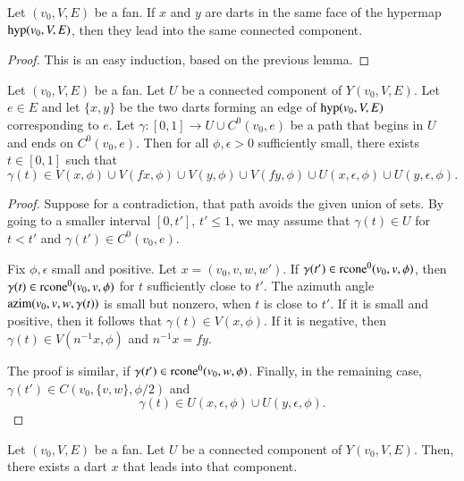 \begin{lemma} Let $(v_0,V,E)$ be a fan.
If $x$ and $y$ are darts in the same face of the hypermap
${\operatorname{hyp}}(v_0,V,E)$, then they lead into the same connected component.
\end{lemma}

\begin{proof}  This is an easy induction, based on the previous
lemma.  
\end{proof}



\begin{lemma}\label{lemma:approach-Ce}
Let $(v_0,V,E)$ be a fan.  Let $U$ be a connected
component of $Y(v_0,V,E)$.  Let $e\in E$ and let $\{x,y\}$
be the two darts forming an edge of ${\operatorname{hyp}}(v_0,V,E)$
corresponding to $e$.  Let $\gamma:[0,1]\to U\cup C^0(v_0,e)$
be a path that begins in $U$ and ends on $C^0(v_0,e)$.
Then for all $\phi,\epsilon>0$ sufficiently small,
there exists  $t\in[0,1]$ such that
  $$\gamma(t)\in 
  V(x,\phi) \cup 
  V(f x,\phi)\cup 
  V(y,\phi)\cup 
  V(f y,\phi) 
  \cup U(x,\epsilon,\phi)
  \cup U(y,\epsilon,\phi).
  $$
\end{lemma}

\begin{proof}
Suppose for a contradiction, that path avoids the given union
of sets.  By going to a smaller interval $[0,t']$, $t'\le 1$,
we may assume that $\gamma(t)\in U$ for $t < t'$ and $\gamma(t')\in
C^0(v_0,e)$.  

Fix $\phi,\epsilon$ small and positive.
Let $x = (v_0,v,w,w')$.
If $\gamma(t')\in {\operatorname{rcone}}^0(v_0,v,\phi)$, then $\gamma(t)\in
{\operatorname{rcone}}^0(v_0,v,\phi)$ for $t$ sufficiently close to $t'$.  The
azimuth angle ${\operatorname{azim}}(v_0,v,w,\gamma(t))$ is small but nonzero, 
when
$t$ is close to $t'$.  If it is small and positive, then 
it follows that $\gamma(t)\in V(x,\phi)$.  If it is negative, then
$\gamma(t)\in V(n^{-1} x,\phi)$ and $n^{-1} x = f y$.

The proof is similar, if $\gamma(t')\in {\operatorname{rcone}}^0(v_0,w,\phi)$.
Finally, in the remaining case, 
$\gamma(t')\in C(v_0,\{v,w\},\phi/2)$ and 
$$\gamma(t)\in U(x,\epsilon,\phi)\cup U(y,\epsilon,\phi).$$
\end{proof}

\begin{lemma}
Let $(v_0,V,E)$ be a fan.  Let $U$ be a connected
component of $Y(v_0,V,E)$.
Then, there exists a
dart $x$ that leads into that component.
\end{lemma}

